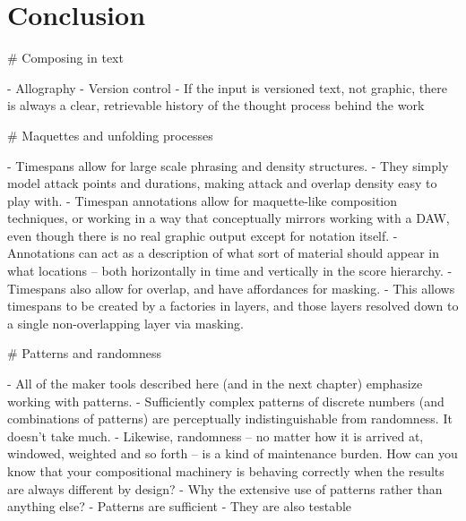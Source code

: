 \chapter{Conclusion}
\label{chap:conclusion}

\begin{markdown}

# Composing in text

-   Allography
-   Version control
-   If the input is versioned text, not graphic, there is always a clear,
    retrievable history of the thought process behind the work

# Maquettes and unfolding processes

-   Timespans allow for large scale phrasing and density structures.
-   They simply model attack points and durations, making attack and overlap
    density easy to play with.
-   Timespan annotations allow for maquette-like composition techniques, or
    working in a way that conceptually mirrors working with a DAW, even though
    there is no real graphic output except for notation itself.
-   Annotations can act as a description of what sort of material should appear
    in what locations -- both horizontally in time and vertically in the score
    hierarchy.
-   Timespans also allow for overlap, and have affordances for masking.
-   This allows timespans to be created by a factories in layers, and those
    layers resolved down to a single non-overlapping layer via masking.

# Patterns and randomness

-   All of the maker tools described here (and in the next chapter) emphasize
    working with patterns.
-   Sufficiently complex patterns of discrete numbers (and combinations of
    patterns) are perceptually indistinguishable from randomness. It doesn't
    take much.
-   Likewise, randomness -- no matter how it is arrived at, windowed, weighted
    and so forth -- is a kind of maintenance burden. How can you know that
    your compositional machinery is behaving correctly when the results are
    always different by design?
-   Why the extensive use of patterns rather than anything else?
-   Patterns are sufficient
-   They are also testable


\end{markdown}
